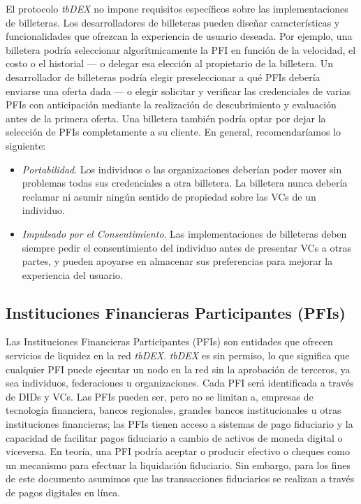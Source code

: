 \documentclass[11pt]{article}
\begin{document}
\vspace{1\baselineskip}
El protocolo \textit{tbDEX} no impone requisitos específicos sobre las implementaciones de billeteras. Los desarrolladores de billeteras pueden diseñar características y funcionalidades que ofrezcan la experiencia de usuario deseada. Por ejemplo, una billetera podría seleccionar algorítmicamente la PFI en función de la velocidad, el costo o el historial — o delegar esa elección al propietario de la billetera. Un desarrollador de billeteras podría elegir preseleccionar a qué PFIs debería enviarse una oferta dada — o elegir solicitar y verificar las credenciales de varias PFIs con anticipación mediante la realización de descubrimiento y evaluación antes de la primera oferta. Una billetera también podría optar por dejar la selección de PFIs completamente a su cliente. En general, recomendaríamos lo siguiente:

\begin{itemize}
	\item \textit{Portabilidad}. Los individuos o las organizaciones deberían poder mover sin problemas todas sus credenciales a otra billetera. La billetera nunca debería reclamar ni asumir ningún sentido de propiedad sobre las VCs de un individuo.

	\item \textit{Impulsado por el Consentimiento}. Las implementaciones de billeteras deben siempre pedir el consentimiento del individuo antes de presentar VCs a otras partes, y pueden apoyarse en almacenar sus preferencias para mejorar la experiencia del usuario.

\end{itemize}
\subsection{Instituciones Financieras Participantes (PFIs)}

\vspace{1\baselineskip}
Las Instituciones Financieras Participantes (PFIs) son entidades que ofrecen servicios de liquidez en la red \textit{tbDEX}. \textit{tbDEX} es sin permiso, lo que significa que cualquier PFI puede ejecutar un nodo en la red sin la aprobación de terceros, ya sea individuos, federaciones u organizaciones. Cada PFI será identificada a través de DIDs y VCs. Las PFIs pueden ser, pero no se limitan a, empresas de tecnología financiera, bancos regionales, grandes bancos institucionales u otras instituciones financieras; las PFIs tienen acceso a sistemas de pago fiduciario y la capacidad de facilitar pagos fiduciario a cambio de activos de moneda digital o viceversa. En teoría, una PFI podría aceptar o producir efectivo o cheques como un mecanismo para efectuar la liquidación fiduciario. Sin embargo, para los fines de este documento asumimos que las transacciones fiduciarios se realizan a través de pagos digitales en línea.
\end{document}
